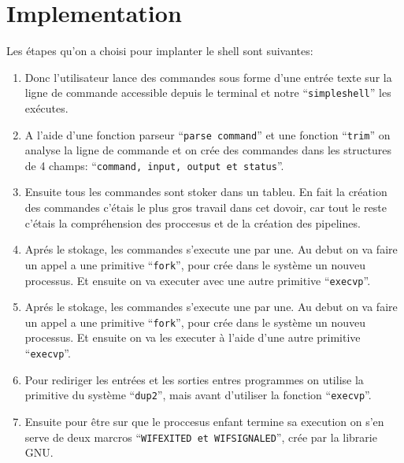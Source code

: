 \documentclass{article}
\begin{document}
\newpage
\section{Implementation}
Les étapes qu'on a choisi pour implanter le shell sont suivantes:
\begin{enumerate}
\item Donc l'utilisateur lance des commandes sous forme d'une entrée texte sur 
la ligne de commande accessible depuis le terminal et notre ``\texttt{simpleshell}''
les exécutes.
\item A l'aide d'une fonction parseur ``\texttt{parse command}'' et une fonction
``\texttt{trim}'' on analyse la ligne de commande et on crée des commandes dans les
structures de 4 champs: ``\texttt{command, input, output et status}''.
\item Ensuite tous les commandes sont stoker dans un tableu. En fait la création des
commandes c'étais le plus gros travail dans cet dovoir, car tout le reste c'étais 
la compréhension des proccesus et de la création des pipelines.
\item Aprés le stokage, les commandes s'execute une par une. Au debut on va faire un appel
a une primitive ``\texttt{fork}'', pour crée dans le système un nouveu processus. 
Et ensuite on va executer avec une autre primitive ``\texttt{execvp}''.
\item Aprés le stokage, les commandes s'execute une par une. Au debut on va faire un appel
a une primitive ``\texttt{fork}'', pour crée dans le système un nouveu processus. 
Et ensuite on va les executer à l'aide d'une autre primitive ``\texttt{execvp}''.
\item Pour rediriger les entrées et les sorties entres programmes on utilise la primitive
du système ``\texttt{dup2}'', mais avant d'utiliser la fonction ``\texttt{execvp}''.
\item Ensuite pour être sur que le proccesus enfant termine sa execution on s'en serve de
deux marcros ``\texttt{WIFEXITED et WIFSIGNALED}'', crée par la librarie GNU.
\end{enumerate}


\newpage
\end{document}
